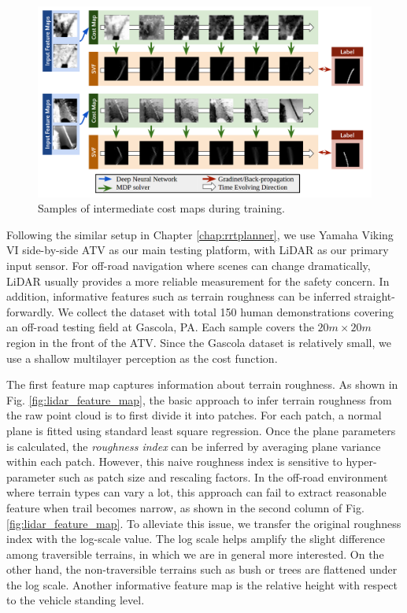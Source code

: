 \documentclass[../thesis.tex]{subfiles}
\begin{document}
\begin{figure}[t]
      \begin{center}
       \centerline{\includegraphics[width=\columnwidth]{./DIRL/fig/inter_cost_map.png}}
            \caption{Samples of intermediate cost maps during training.}
            \label{fig:inter_cost_map}
      \end{center}
\end{figure}

Following the similar setup in Chapter \ref{chap:rrtplanner}, we use Yamaha Viking VI side-by-side ATV as our main testing platform, with LiDAR as our primary input sensor.
For off-road navigation where scenes can change dramatically, LiDAR usually provides a more reliable measurement for the safety concern.
In addition, informative features such as terrain roughness can be inferred straight-forwardly.
We collect the dataset with total 150 human demonstrations covering an off-road testing field at Gascola, PA. Each sample covers the $20m \times 20m$ region in the front of the ATV. Since the Gascola dataset is relatively small, we use a shallow multilayer perception as the cost function.
 
The first feature map captures information about terrain roughness.
As shown in Fig. \ref{fig:lidar_feature_map}, the basic approach to infer terrain roughness from the raw point cloud is to first divide it into patches.
For each patch, a normal plane is fitted using standard least square regression.
Once the plane parameters is calculated, the \textit{roughness index} can be inferred by averaging plane variance within each patch.
However, this naive roughness index is sensitive to hyper-parameter such as patch size and rescaling factors.
In the off-road environment where terrain types can vary a lot, this approach can fail to extract reasonable feature when trail becomes narrow, as shown in the second column of Fig. \ref{fig:lidar_feature_map}.
To alleviate this issue, we transfer the original roughness index with the log-scale value.
The log scale helps amplify the slight difference among traversible terrains, in which we are in general more interested.
On the other hand, the non-traversible terrains such as bush or trees are flattened under the log scale.
Another informative feature map is the relative height with respect to the vehicle standing level.
 
\end{document}
